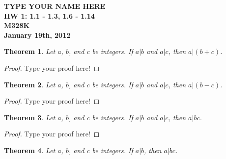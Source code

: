 \documentclass[12pt,leqno]{article}
\numberwithin{equation}{section}
\newtheorem{thm}{Theorem}[section]
\theoremstyle{definition}
\begin{document}
\thispagestyle{plain}
\begin{flushright}
\large{\textbf{TYPE YOUR NAME HERE \\
HW 1: 1.1 - 1.3, 1.6 - 1.14\\
M328K \\
January 19th, 2012 \\}}
\end{flushright}

\markboth{}{} \setcounter{section}{0} \baselineskip=18pt

\setcounter{tocdepth}{4}



\setcounter{section}{1}
\begin{thm}
Let $a$, $b$, and $c$ be integers.  If $a|b$ and $a|c$, then $a|(b +
c)$.
\end{thm}

\begin{proof}[Proof]
Type your proof here!
\end{proof}

\begin{thm}
Let $a$, $b$, and $c$ be integers. If $a|b$ and $a|c$, then $a|(b -
c)$.
\end{thm}

\begin{proof}[Proof]
Type your proof here!
\end{proof}

\begin{thm}
Let $a$, $b$, and $c$ be integers. If $a|b$ and $a|c$, then $a|bc$.
\end{thm}

\begin{proof}[Proof]
Type your proof here!
\end{proof}

\setcounter{thm}{5}

\begin{thm}
Let $a$, $b$, and $c$ be integers. If $a|b$, then $a|bc$.
\end{thm}
\end{document}
